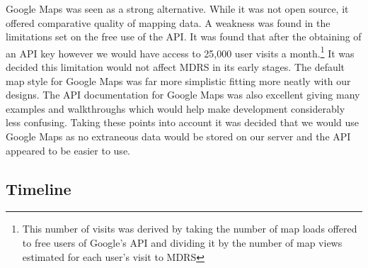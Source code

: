 \documentclass{l3proj}
\begin{document}
Google Maps\cite{googleMaps} was seen as a strong alternative. While it was not open source, it offered comparative quality of mapping data. A weakness was found in the limitations set on the free use of the \gls{API}. It was found that after the obtaining of an API key however we would have access to 25,000 user visits a month.\footnote{This number of visits was derived by taking the number of map loads offered to free users of Google's API and dividing it by the number of map views estimated for each user's visit to MDRS} It was decided this limitation would not affect MDRS in its early stages. The default map style for Google Maps was far more simplistic  fitting more neatly with our designs. The API documentation for Google Maps was also excellent giving many examples and walkthroughs which would help make development considerably less confusing. Taking these points into account it was decided that we would use Google Maps as no extraneous data would be stored on our server and the API appeared to be easier to use.

\subsection{Timeline}



\end{document}
